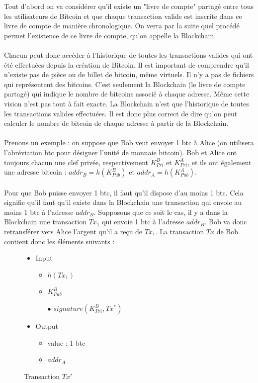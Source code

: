\documentclass[11pt,a4paper]{article}
\begin{document}
Tout d'abord on va considérer qu'il existe un "livre de compte" partagé entre tous les utilisateurs de Bitcoin et que chaque transaction valide est inscrite dans ce livre de compte de manière chronologique. On verra par la suite quel procédé permet l'existence de ce livre de compte, qu'on appelle la Blockchain.\\\\
Chacun peut donc accéder à l'historique de toutes les transactions valides qui ont été effectuées depuis la création de Bitcoin. Il est important de comprendre qu'il n'existe pas de pièce ou de billet de bitcoin, même virtuels. Il n'y a pas de fichiers qui représentent des bitcoins. C'est seulement la Blockchain (le livre de compte partagé) qui indique le nombre de bitcoins associé à chaque adresse.  Même cette vision n'est pas tout à fait exacte. La Blockchain n'est que l'historique de toutes les transactions valides effectuées. Il est donc plus correct de dire qu'on peut calculer le nombre de bitcoin de chaque adresse à partir de la Blockchain.\\\\
Prenons un exemple : on suppose que Bob veut envoyer 1 btc à Alice (on utilisera l'abréviation btc pour désigner l'unité de monnaie bitcoin). Bob et Alice ont toujours chacun une clef privée, respectivement $K_{Pri}^{B}$ et $K_{Pri}^{A}$, et ils ont également une adresse bitcoin : $addr_B = h(K_{Pub}^{B})$ et $addr_A = h(K_{Pub}^{A})$.\\\\
Pour que Bob puisse envoyer 1 btc, il faut qu'il dispose d'au moins 1 btc. Cela signifie qu'il faut qu'il existe dans la Blockchain une transaction qui envoie au moins 1 btc à l'adresse $addr_B$. Supposons que ce soit le cas, il y a dans la Blockchain une transaction $Tx_1$ qui envoie 1 btc à l'adresse  $addr_B$. Bob va donc retransférer vers Alice l'argent qu'il a reçu de $Tx_1$.
La transaction $Tx$ de Bob contient donc les éléments suivants :\\


\begin{figure}[H]
\begin{itemize}
\renewcommand{\labelitemi}{$\bullet$}
\renewcommand{\labelitemii}{$\star$}

\item Input
\begin{itemize}
\item $h(Tx_1)$
\item $K_{Pub}^{B}$
\item[$\bullet$] $signature(K_{Pri}^{B}, Tx^*)$
\end{itemize}

\item Output
\begin{itemize}
\item value : 1 btc
\item $addr_A$
\end{itemize}

\end{itemize}

\caption{Transaction $Tx'$}
\end{figure}
\end{document}
